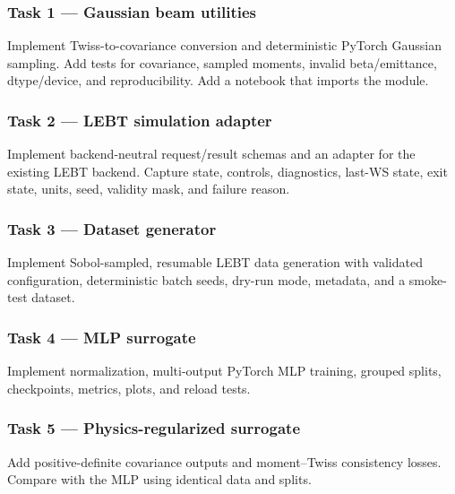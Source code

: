 \documentclass[
]{article}
\begin{document}
\hypertarget{task-1-gaussian-beam-utilities}{%
\subsubsection{Task 1 --- Gaussian beam
utilities}\label{task-1-gaussian-beam-utilities}}

Implement Twiss-to-covariance conversion and deterministic PyTorch
Gaussian sampling. Add tests for covariance, sampled moments, invalid
beta/emittance, dtype/device, and reproducibility. Add a notebook that
imports the module.

\hypertarget{task-2-lebt-simulation-adapter}{%
\subsubsection{Task 2 --- LEBT simulation
adapter}\label{task-2-lebt-simulation-adapter}}

Implement backend-neutral request/result schemas and an adapter for the
existing LEBT backend. Capture state, controls, diagnostics, last-WS
state, exit state, units, seed, validity mask, and failure reason.

\hypertarget{task-3-dataset-generator}{%
\subsubsection{Task 3 --- Dataset
generator}\label{task-3-dataset-generator}}

Implement Sobol-sampled, resumable LEBT data generation with validated
configuration, deterministic batch seeds, dry-run mode, metadata, and a
smoke-test dataset.

\hypertarget{task-4-mlp-surrogate}{%
\subsubsection{Task 4 --- MLP surrogate}\label{task-4-mlp-surrogate}}

Implement normalization, multi-output PyTorch MLP training, grouped
splits, checkpoints, metrics, plots, and reload tests.

\hypertarget{task-5-physics-regularized-surrogate}{%
\subsubsection{Task 5 --- Physics-regularized
surrogate}\label{task-5-physics-regularized-surrogate}}

Add positive-definite covariance outputs and moment--Twiss consistency
losses. Compare with the MLP using identical data and splits.
\end{document}
